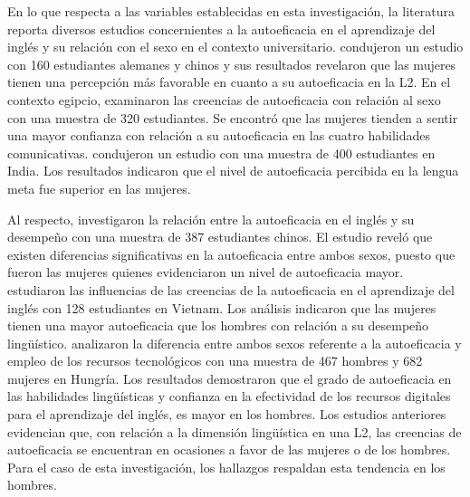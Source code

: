\documentclass[spanish]{textolivre}
\begin{document}
En lo que respecta a las variables establecidas en esta investigación, la literatura reporta diversos estudios concernientes a la autoeficacia en el aprendizaje del inglés y su relación con el sexo en el contexto universitario. \textcite{wang_self-efficacy_2013} condujeron un estudio con 160 estudiantes alemanes y chinos y sus resultados revelaron que las mujeres tienen una percepción más favorable en cuanto a su autoeficacia en la L2. En el contexto egipcio, \textcite{abdelhafez_efl_2016} examinaron las creencias de autoeficacia con relación al sexo con una muestra de 320 estudiantes. Se encontró que las mujeres tienden a sentir una mayor confianza con relación a su autoeficacia en las cuatro habilidades comunicativas. \textcite{hasan_effect_2019} condujeron un estudio con una muestra de 400 estudiantes en India. Los resultados indicaron que el nivel de autoeficacia percibida en la lengua meta fue superior en las mujeres. 
 
Al respecto, \textcite{zhu_relationship_2020} investigaron la relación entre la autoeficacia en el inglés y su desempeño con una muestra de 387 estudiantes chinos. El estudio reveló que existen diferencias significativas en la autoeficacia entre ambos sexos, puesto que fueron las mujeres quienes evidenciaron un nivel de autoeficacia mayor. \textcite{nguyen_relationship_2022} estudiaron las influencias de las creencias de la autoeficacia en el aprendizaje del inglés con 128 estudiantes en Vietnam. Los análisis indicaron que las mujeres tienen una mayor autoeficacia que los hombres con relación a su desempeño lingüístico. \textcite{csizer_gender-related_2024} analizaron la diferencia entre ambos sexos referente a la autoeficacia y empleo de los recursos tecnológicos con una muestra de 467 hombres y 682 mujeres en Hungría. Los resultados demostraron que el grado de autoeficacia en las habilidades lingüísticas y confianza en la efectividad de los recursos digitales para el aprendizaje del inglés, es mayor en los hombres. Los estudios anteriores evidencian que, con relación a la dimensión lingüística en una L2, las creencias de autoeficacia se encuentran en ocasiones a favor de las mujeres o de los hombres. Para el caso de esta investigación, los hallazgos respaldan esta tendencia en los hombres.
\end{document}
